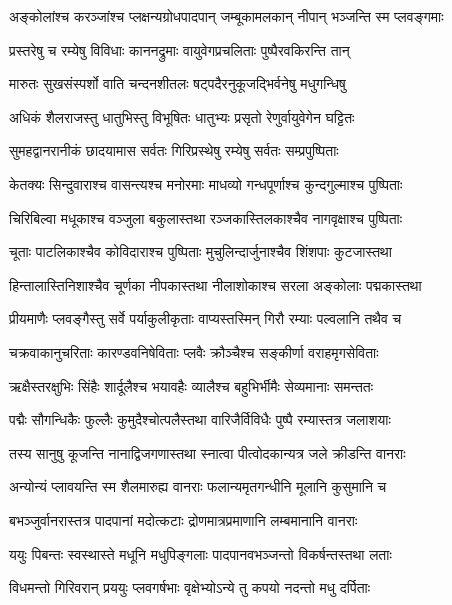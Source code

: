 \twolineshloka
{अङ्कोलांश्च करञ्जांश्च प्लक्षन्यग्रोधपादपान्}
{जम्बूकामलकान् नीपान् भञ्जन्ति स्म प्लवङ्गमाः} %

\twolineshloka
{प्रस्तरेषु च रम्येषु विविधाः काननद्रुमाः}
{वायुवेगप्रचलिताः पुष्पैरवकिरन्ति तान्} %

\twolineshloka
{मारुतः सुखसंस्पर्शो वाति चन्दनशीतलः}
{षट्पदैरनुकूजद्भिर्वनेषु मधुगन्धिषु} %

\twolineshloka
{अधिकं शैलराजस्तु धातुभिस्तु विभूषितः}
{धातुभ्यः प्रसृतो रेणुर्वायुवेगेन घट्टितः} %

\twolineshloka
{सुमहद्वानरानीकं छादयामास सर्वतः}
{गिरिप्रस्थेषु रम्येषु सर्वतः सम्प्रपुष्पिताः} %

\twolineshloka
{केतक्यः सिन्दुवाराश्च वासन्त्यश्च मनोरमाः}
{माधव्यो गन्धपूर्णाश्च कुन्दगुल्माश्च पुष्पिताः} %

\twolineshloka
{चिरिबिल्वा मधूकाश्च वञ्जुला बकुलास्तथा}
{रञ्जकास्तिलकाश्चैव नागवृक्षाश्च पुष्पिताः} %

\twolineshloka
{चूताः पाटलिकाश्चैव कोविदाराश्च पुष्पिताः}
{मुचुलिन्दार्जुनाश्चैव शिंशपाः कुटजास्तथा} %

\twolineshloka
{हिन्तालास्तिनिशाश्चैव चूर्णका नीपकास्तथा}
{नीलाशोकाश्च सरला अङ्कोलाः पद्मकास्तथा} %

\twolineshloka
{प्रीयमाणैः प्लवङ्गैस्तु सर्वे पर्याकुलीकृताः}
{वाप्यस्तस्मिन् गिरौ रम्याः पल्वलानि तथैव च} %

\twolineshloka
{चक्रवाकानुचरिताः कारण्डवनिषेविताः}
{प्लवैः क्रौञ्चैश्च सङ्कीर्णा वराहमृगसेविताः} %

\twolineshloka
{ऋक्षैस्तरक्षुभिः सिंहैः शार्दूलैश्च भयावहैः}
{व्यालैश्च बहुभिर्भीमैः सेव्यमानाः समन्ततः} %

\twolineshloka
{पद्मैः सौगन्धिकैः फुल्लैः कुमुदैश्चोत्पलैस्तथा}
{वारिजैर्विविधैः पुष्पै रम्यास्तत्र जलाशयाः} %

\twolineshloka
{तस्य सानुषु कूजन्ति नानाद्विजगणास्तथा}
{स्नात्वा पीत्वोदकान्यत्र जले क्रीडन्ति वानराः} %

\twolineshloka
{अन्योन्यं प्लावयन्ति स्म शैलमारुह्य वानराः}
{फलान्यमृतगन्धीनि मूलानि कुसुमानि च} %

\twolineshloka
{बभञ्जुर्वानरास्तत्र पादपानां मदोत्कटाः}
{द्रोणमात्रप्रमाणानि लम्बमानानि वानराः} %

\twolineshloka
{ययुः पिबन्तः स्वस्थास्ते मधूनि मधुपिङ्गलाः}
{पादपानवभञ्जन्तो विकर्षन्तस्तथा लताः} %

\twolineshloka
{विधमन्तो गिरिवरान् प्रययुः प्लवगर्षभाः}
{वृक्षेभ्योऽन्ये तु कपयो नदन्तो मधु दर्पिताः} %

